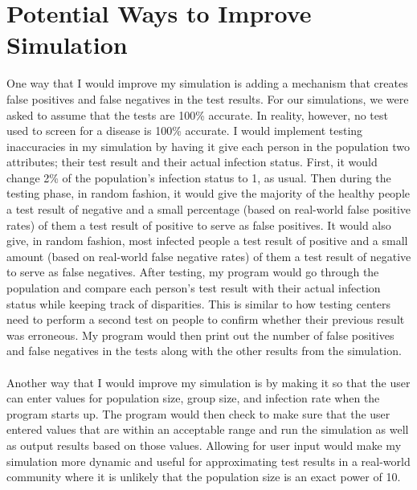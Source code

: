 \documentclass[letterpaper, 10pt,DIV=13]{scrartcl}
\numberwithin{equation}{section} %
\numberwithin{figure}{section} %
\numberwithin{table}{section} %
\begin{document}
\section{Potential Ways to Improve Simulation}\label{operations}
One way that I would improve my simulation is adding a mechanism that creates false positives and false negatives in the test results. For our simulations, we were asked to assume that the tests are 100\% accurate. In reality, however, no test used to screen for a disease is 100\% accurate. I would implement testing inaccuracies in my simulation by having it give each person in the population two attributes; their test result and their actual infection status. First, it would change 2\% of the population's infection status to 1, as usual. Then during the testing phase, in random fashion, it would give the majority of the healthy people a test result of negative and a small percentage (based on real-world false positive rates) of them a test result of positive to serve as false positives. It would also give, in random fashion, most infected people a test result of positive and a small amount (based on real-world false negative rates) of them a test result of negative to serve as false negatives. After testing, my program would go through the population and compare each person's test result with their actual infection status while keeping track of disparities. This is similar to how testing centers need to perform a second test on people to confirm whether their previous result was erroneous. My program would then print out the number of false positives and false negatives in the tests along with the other results from the simulation. \\
\\
Another way that I would improve my simulation is by making it so that the user can enter values for population size, group size, and infection rate when the program starts up. The program would then check to make sure that the user entered values that are within an acceptable range and run the simulation as well as output results based on those values. Allowing for user input would make my simulation more dynamic and useful for approximating test results in a real-world community where it is unlikely that the population size is an exact power of 10.
\end{document}
